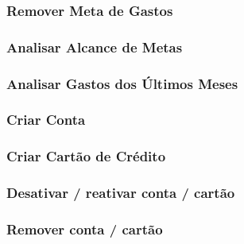 \documentclass[a4paper]{abnt}
\begin{document}
\subsubsection{Remover Meta de Gastos}
\subsubsection{Analisar Alcance de Metas}
\subsubsection{Analisar Gastos dos Últimos Meses}
\subsubsection{Criar Conta}
\subsubsection{Criar Cart\~ao de Crédito}
\subsubsection{Desativar / reativar conta / cartão}
\subsubsection{Remover conta / cartão}

\pagebreak
\end{document}
